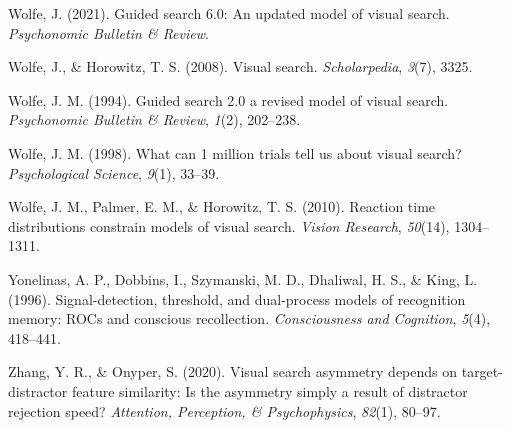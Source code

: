 \documentclass[12pt,twoside]{reedthesis}
\begin{document}
\leavevmode\hypertarget{ref-wolfe2021guided}{}%
Wolfe, J. (2021). Guided search 6.0: An updated model of visual search. \emph{Psychonomic Bulletin \& Review}.

\leavevmode\hypertarget{ref-wolfe2008visual}{}%
Wolfe, J., \& Horowitz, T. S. (2008). Visual search. \emph{Scholarpedia}, \emph{3}(7), 3325.

\leavevmode\hypertarget{ref-wolfe1994guided}{}%
Wolfe, J. M. (1994). Guided search 2.0 a revised model of visual search. \emph{Psychonomic Bulletin \& Review}, \emph{1}(2), 202--238.

\leavevmode\hypertarget{ref-wolfe1998can}{}%
Wolfe, J. M. (1998). What can 1 million trials tell us about visual search? \emph{Psychological Science}, \emph{9}(1), 33--39.

\leavevmode\hypertarget{ref-wolfe2010reaction}{}%
Wolfe, J. M., Palmer, E. M., \& Horowitz, T. S. (2010). Reaction time distributions constrain models of visual search. \emph{Vision Research}, \emph{50}(14), 1304--1311.

\leavevmode\hypertarget{ref-yonelinas1996signal}{}%
Yonelinas, A. P., Dobbins, I., Szymanski, M. D., Dhaliwal, H. S., \& King, L. (1996). Signal-detection, threshold, and dual-process models of recognition memory: ROCs and conscious recollection. \emph{Consciousness and Cognition}, \emph{5}(4), 418--441.

\leavevmode\hypertarget{ref-zhang2020visual}{}%
Zhang, Y. R., \& Onyper, S. (2020). Visual search asymmetry depends on target-distractor feature similarity: Is the asymmetry simply a result of distractor rejection speed? \emph{Attention, Perception, \& Psychophysics}, \emph{82}(1), 80--97.


\end{document}
